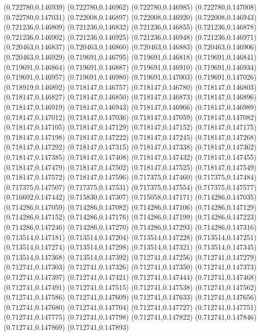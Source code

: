 (0.722780,0.146939)
(0.722780,0.146962)
(0.722780,0.146985)
(0.722780,0.147008)
(0.722780,0.147031)
(0.722008,0.146897)
(0.722008,0.146920)
(0.722008,0.146943)
(0.721236,0.146809)
(0.721236,0.146832)
(0.721236,0.146855)
(0.721236,0.146878)
(0.721236,0.146902)
(0.721236,0.146925)
(0.721236,0.146948)
(0.721236,0.146971)
(0.720463,0.146837)
(0.720463,0.146860)
(0.720463,0.146883)
(0.720463,0.146906)
(0.720463,0.146929)
(0.719691,0.146795)
(0.719691,0.146818)
(0.719691,0.146841)
(0.719691,0.146864)
(0.719691,0.146887)
(0.719691,0.146910)
(0.719691,0.146934)
(0.719691,0.146957)
(0.719691,0.146980)
(0.719691,0.147003)
(0.719691,0.147026)
(0.718919,0.146892)
(0.718147,0.146757)
(0.718147,0.146780)
(0.718147,0.146803)
(0.718147,0.146827)
(0.718147,0.146850)
(0.718147,0.146873)
(0.718147,0.146896)
(0.718147,0.146919)
(0.718147,0.146943)
(0.718147,0.146966)
(0.718147,0.146989)
(0.718147,0.147012)
(0.718147,0.147036)
(0.718147,0.147059)
(0.718147,0.147082)
(0.718147,0.147105)
(0.718147,0.147129)
(0.718147,0.147152)
(0.718147,0.147175)
(0.718147,0.147198)
(0.718147,0.147222)
(0.718147,0.147245)
(0.718147,0.147268)
(0.718147,0.147292)
(0.718147,0.147315)
(0.718147,0.147338)
(0.718147,0.147362)
(0.718147,0.147385)
(0.718147,0.147408)
(0.718147,0.147432)
(0.718147,0.147455)
(0.718147,0.147479)
(0.718147,0.147502)
(0.718147,0.147525)
(0.718147,0.147549)
(0.718147,0.147572)
(0.718147,0.147596)
(0.717375,0.147460)
(0.717375,0.147484)
(0.717375,0.147507)
(0.717375,0.147531)
(0.717375,0.147554)
(0.717375,0.147577)
(0.716602,0.147442)
(0.715830,0.147307)
(0.715058,0.147171)
(0.714286,0.147035)
(0.714286,0.147059)
(0.714286,0.147082)
(0.714286,0.147106)
(0.714286,0.147129)
(0.714286,0.147152)
(0.714286,0.147176)
(0.714286,0.147199)
(0.714286,0.147223)
(0.714286,0.147246)
(0.714286,0.147270)
(0.714286,0.147293)
(0.714286,0.147316)
(0.713514,0.147181)
(0.713514,0.147204)
(0.713514,0.147228)
(0.713514,0.147251)
(0.713514,0.147274)
(0.713514,0.147298)
(0.713514,0.147321)
(0.713514,0.147345)
(0.713514,0.147368)
(0.713514,0.147392)
(0.712741,0.147256)
(0.712741,0.147279)
(0.712741,0.147303)
(0.712741,0.147326)
(0.712741,0.147350)
(0.712741,0.147373)
(0.712741,0.147397)
(0.712741,0.147421)
(0.712741,0.147444)
(0.712741,0.147468)
(0.712741,0.147491)
(0.712741,0.147515)
(0.712741,0.147538)
(0.712741,0.147562)
(0.712741,0.147586)
(0.712741,0.147609)
(0.712741,0.147633)
(0.712741,0.147656)
(0.712741,0.147680)
(0.712741,0.147704)
(0.712741,0.147727)
(0.712741,0.147751)
(0.712741,0.147775)
(0.712741,0.147798)
(0.712741,0.147822)
(0.712741,0.147846)
(0.712741,0.147869)
(0.712741,0.147893)
